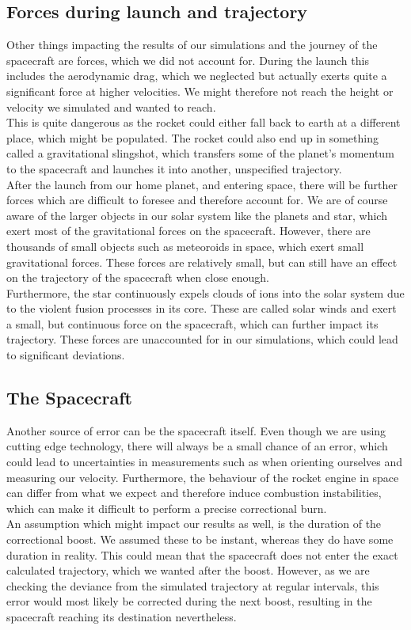 \documentclass[reprint,english,notitlepage]{revtex4-2}
\begin{document}
\subsection{Forces during launch and trajectory}\label{subsec:the-launch}
    Other things impacting the results of our simulations and the journey of the spacecraft are forces, which we did not account for.
    During the launch this includes the aerodynamic drag, which we neglected but actually exerts quite a significant force at higher velocities.
    We might therefore not reach the height or velocity we simulated and wanted to reach.\\
    This is quite dangerous as the rocket could either fall back to earth at a different place, which might be populated.
    The rocket could also end up in something called a gravitational slingshot, which transfers some of the planet's momentum to the spacecraft and launches it into another, unspecified trajectory.\\

    After the launch from our home planet, and entering space, there will be further forces which are difficult to foresee and therefore account for.
    We are of course aware of the larger objects in our solar system like the planets and star, which exert most of the gravitational forces on the spacecraft.
    However, there are thousands of small objects such as meteoroids in space, which exert small gravitational forces.
    These forces are relatively small, but can still have an effect on the trajectory of the spacecraft when close enough.\\
    Furthermore, the star continuously expels clouds of ions into the solar system due to the violent fusion processes in its core.
    These are called solar winds and exert a small, but continuous force on the spacecraft, which can further impact its trajectory.
    These forces are unaccounted for in our simulations, which could lead to significant deviations.

\subsection{The Spacecraft}\label{subsec:the-spacecraft}
    Another source of error can be the spacecraft itself.
    Even though we are using cutting edge technology, there will always be a small chance of an error, which could lead to uncertainties in measurements such as when orienting ourselves and measuring our velocity.
    Furthermore, the behaviour of the rocket engine in space can differ from what we expect and therefore induce combustion instabilities, which can make it difficult to perform a precise correctional burn.\\
    An assumption which might impact our results as well, is the duration of the correctional boost.
    We assumed these to be instant, whereas they do have some duration in reality.
    This could mean that the spacecraft does not enter the exact calculated trajectory, which we wanted after the boost.
    However, as we are checking the deviance from the simulated trajectory at regular intervals, this error would most likely be corrected during the next boost, resulting in the spacecraft reaching its destination nevertheless.
\end{document}
